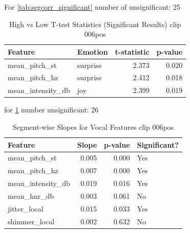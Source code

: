 For \ref{tab:segcorr_significant} number of unsignificant: 25 



\begin{table}[H]
    \centering
    \begin{tabular}{llrr}
        \toprule
        \textbf{Feature}         & \textbf{Emotion} & \textbf{t-statistic} & \textbf{p-value} \\
        \midrule
        mean\_pitch\_st          & surprise         & 2.373                & 0.020            \\
        mean\_pitch\_hz          & surprise         & 2.412                & 0.018            \\
        mean\_intensity\_db      & joy              & 2.399                & 0.019            \\
        \bottomrule
    \end{tabular}
    \caption{High vs Low T-test Statistics (Significant Results) clip 006pos}
    \label{tab:seghighlow_ttest}
\end{table}
  
for \ref{tab:seghighlow_ttest} number unsignificant: 26 

\begin{table}[H]
    \centering
    \begin{tabular}{lrrl}
        \toprule
        \textbf{Feature}         & \textbf{Slope}  & \textbf{p-value} & \textbf{Significant?} \\
        \midrule
        mean\_pitch\_st          & 0.005           & 0.000            & Yes                  \\
        mean\_pitch\_hz          & 0.007           & 0.000            & Yes                  \\
        mean\_intensity\_db      & 0.019           & 0.016            & Yes                  \\
        mean\_hnr\_db            & 0.003           & 0.061            & No                   \\
        jitter\_local            & 0.015           & 0.033            & Yes                  \\
        shimmer\_local           & 0.002           & 0.632            & No                   \\
        \bottomrule
    \end{tabular}
    \caption{Segment-wise Slopes for Vocal Features clip 006pos}
    \label{tab:segslope_significant}
\end{table}




